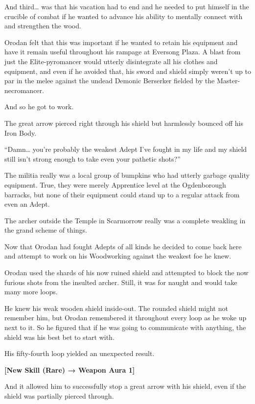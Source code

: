 \documentclass[a4paper,10pt]{book}
\begin{document}
And third… was that his vacation had to end and he needed to put himself in the crucible of combat if he wanted to advance his ability to mentally connect with and strengthen the wood.\par
Orodan felt that this was important if he wanted to retain his equipment and have it remain useful throughout his rampage at Eversong Plaza. A blast from just the Elite-pyromancer would utterly disintegrate all his clothes and equipment, and even if he avoided that, his sword and shield simply weren’t up to par in the melee against the undead Demonic Berserker fielded by the Master-necromancer.\par
And so he got to work.\par
\par
The great arrow pierced right through his shield but harmlessly bounced off his Iron Body.\par
“Damn… you’re probably the weakest Adept I’ve fought in my life and my shield still isn’t strong enough to take even your pathetic shots?”\par
The militia really was a local group of bumpkins who had utterly garbage quality equipment. True, they were merely Apprentice level at the Ogdenborough barracks, but none of their equipment could stand up to a regular attack from even an Adept.\par
The archer outside the Temple in Scarmorrow really was a complete weakling in the grand scheme of things.\par
Now that Orodan had fought Adepts of all kinds he decided to come back here and attempt to work on his Woodworking against the weakest foe he knew.\par
Orodan used the shards of his now ruined shield and attempted to block the now furious shots from the insulted archer. Still, it was for naught and would take many more loops.\par
He knew his weak wooden shield inside-out. The rounded shield might not remember him, but Orodan remembered it throughout every loop as he woke up next to it. So he figured that if he was going to communicate with anything, the shield was his best bet to start with.\par
His fifty-fourth loop yielded an unexpected result.\par
\textbf{[New Skill (Rare) → Weapon Aura 1]}\par
And it allowed him to successfully stop a great arrow with his shield, even if the shield was partially pierced through.\par
\end{document}
